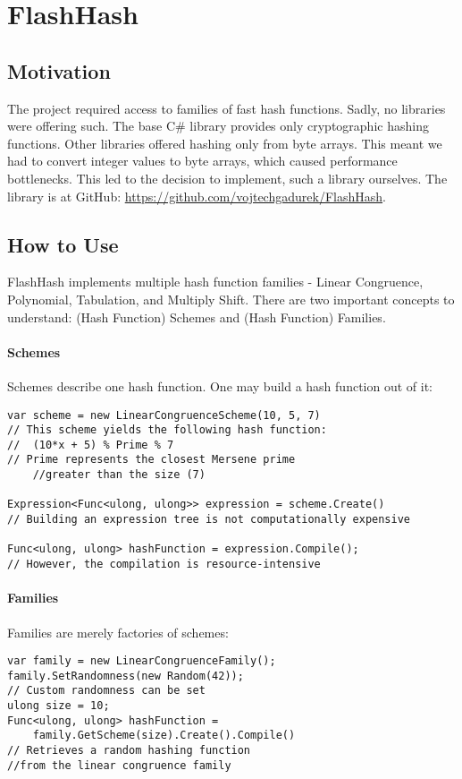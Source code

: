 \chapter{FlashHash}\label{FlashHash}
\section{Motivation}
The project required access to families of fast hash functions. Sadly, no libraries were offering such. The base C\# library provides only cryptographic hashing functions. Other libraries offered hashing only from byte arrays. This meant we had to convert integer values to byte arrays, which caused performance bottlenecks. This led to the decision to implement, such a library ourselves. The library is at GitHub:  \url{https://github.com/vojtechgadurek/FlashHash}.

\section{How to Use}
FlashHash implements multiple hash function families - Linear Congruence, Polynomial, Tabulation, and Multiply Shift.
There are two important concepts to understand: (Hash Function) Schemes and (Hash Function) Families. 
\subsubsection{Schemes}
Schemes describe one hash function. One may build a hash function out of it:
\begin{lstlisting}
var scheme = new LinearCongruenceScheme(10, 5, 7)
// This scheme yields the following hash function:
//  (10*x + 5) % Prime % 7
// Prime represents the closest Mersene prime 
	//greater than the size (7)

Expression<Func<ulong, ulong>> expression = scheme.Create()
// Building an expression tree is not computationally expensive

Func<ulong, ulong> hashFunction = expression.Compile();
// However, the compilation is resource-intensive
\end{lstlisting}

\subsubsection{Families}
Families are merely factories of schemes:
\begin{lstlisting}
var family = new LinearCongruenceFamily();
family.SetRandomness(new Random(42));
// Custom randomness can be set
ulong size = 10;
Func<ulong, ulong> hashFunction = 
    family.GetScheme(size).Create().Compile()
// Retrieves a random hashing function 
//from the linear congruence family
\end{lstlisting}



